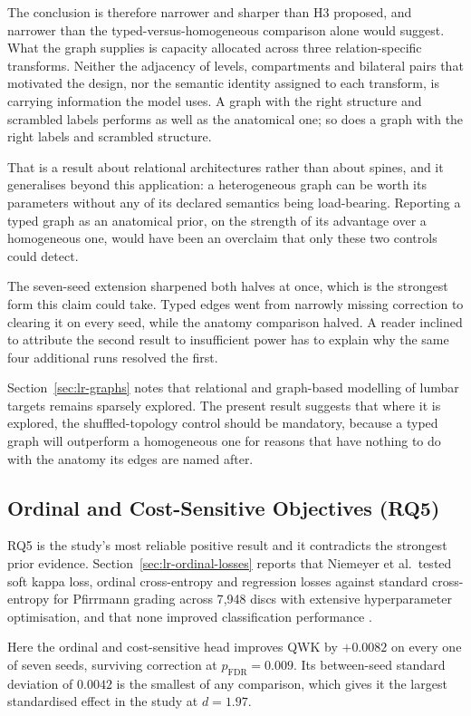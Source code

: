 \documentclass[12pt,a4paper]{report}
\begin{document}
The conclusion is therefore narrower and sharper than H3 proposed, and narrower
than the typed-versus-homogeneous comparison alone would suggest. What the graph
supplies is capacity allocated across three relation-specific transforms.
Neither the adjacency of levels, compartments and bilateral pairs that motivated
the design, nor the semantic identity assigned to each transform, is carrying
information the model uses. A graph with the right structure and scrambled
labels performs as well as the anatomical one; so does a graph with the right
labels and scrambled structure.

That is a result about relational architectures rather than about spines, and it
generalises beyond this application: a heterogeneous graph can be worth its
parameters without any of its declared semantics being load-bearing. Reporting a
typed graph as an anatomical prior, on the strength of its advantage over a
homogeneous one, would have been an overclaim that only these two controls could
detect.

The seven-seed extension sharpened both halves at once, which is the strongest
form this claim could take. Typed edges went from narrowly missing correction to
clearing it on every seed, while the anatomy comparison halved. A reader
inclined to attribute the second result to insufficient power has to explain why
the same four additional runs resolved the first.

Section~\ref{sec:lr-graphs} notes that relational and graph-based modelling of
lumbar targets remains sparsely explored. The present result suggests that where
it is explored, the shuffled-topology control should be mandatory, because a
typed graph will outperform a homogeneous one for reasons that have nothing to
do with the anatomy its edges are named after.

\subsection{Ordinal and Cost-Sensitive Objectives (RQ5)}

RQ5 is the study's most reliable positive result and it contradicts the strongest
prior evidence. Section~\ref{sec:lr-ordinal-losses} reports that Niemeyer et al.\
tested soft kappa loss, ordinal cross-entropy and regression losses against
standard cross-entropy for Pfirrmann grading across 7{,}948 discs with extensive
hyperparameter optimisation, and that none improved classification performance
\cite{niemeyer2021a}.

Here the ordinal and cost-sensitive head improves QWK by $+0.0082$ on every one
of seven seeds, surviving correction at $p_{\mathrm{FDR}} = 0.009$. Its
between-seed standard deviation of $0.0042$ is the smallest of any comparison,
which gives it the largest standardised effect in the study at $d = 1.97$.
\end{document}
